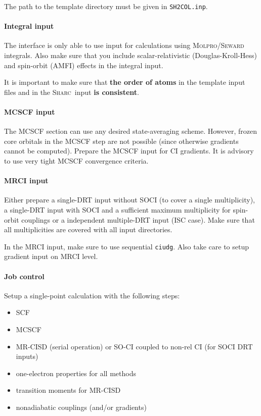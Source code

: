 \documentclass[a4paper,11pt,DIV=15,openany,twoside=false]{scrbook}
\newcommand{\sharc}{\textsc{Sharc}}
\newcommand{\ttt}[1]{\texttt{#1}}
\begin{document}
The path to the template directory must be given in \ttt{SH2COL.inp}.

\paragraph{Integral input}

The interface is only able to use input for calculations using \textsc{Molpro/Seward} integrals. Also make sure that you include scalar-relativistic (Douglas-Kroll-Hess) and spin-orbit (AMFI) effects in the integral input.

It is important to make sure that \textbf{the order of atoms} in the template input files and in the \sharc\ input \textbf{is consistent}.

\paragraph{MCSCF input}

The MCSCF section can use any desired state-averaging scheme. However, frozen core orbitals in the MCSCF step are not possible (since otherwise gradients cannot be computed). Prepare the MCSCF input for CI gradients. It is advisory to use very tight MCSCF convergence criteria.

\paragraph{MRCI input}

Either prepare a single-DRT input without SOCI (to cover a single multiplicity), a single-DRT input with SOCI and a sufficient maximum multiplicity for spin-orbit couplings or a independent multiple-DRT input (ISC case). Make sure that all multiplicities are covered with all input directories.

In the MRCI input, make sure to use sequential \ttt{ciudg}. Also take care to setup gradient input on MRCI level.

\paragraph{Job control}

Setup a single-point calculation with the following steps:
\begin{itemize}
  \item SCF
  \item MCSCF
  \item MR-CISD (serial operation) or SO-CI coupled to non-rel CI (for SOCI DRT inputs)
  \item one-electron properties for all methods
  \item transition moments for MR-CISD
  \item nonadiabatic couplings (and/or gradients)
\end{itemize}
\end{document}
